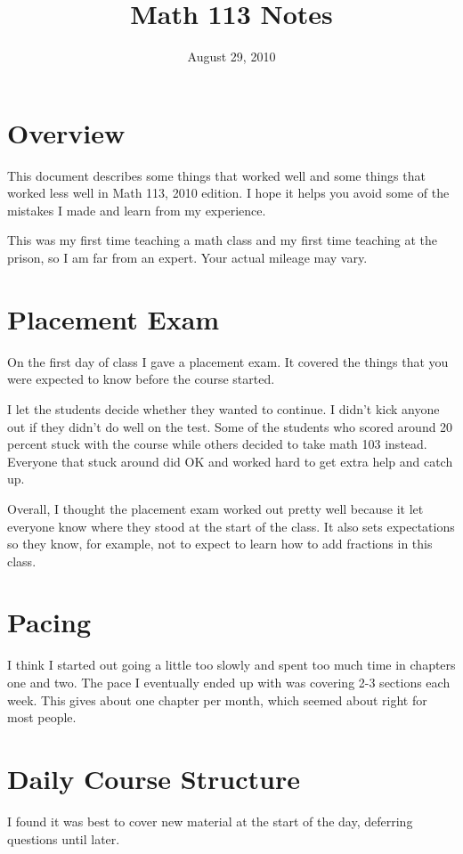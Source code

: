 \documentclass{article}
\title{Math 113 Notes}
\date{August 29, 2010}
\begin{document}
\maketitle

\section{Overview}

This document describes some things that worked well and some things that worked less well in Math 113, 2010 edition.  I
hope it helps you avoid some of the mistakes I made and learn from my experience.

This was my first time teaching a math class and my first time teaching at the prison, so I am far from an expert.  Your
actual mileage may vary.

\section{Placement Exam}
On the first day of class I gave a placement exam.  It covered the things that you were expected to know before the
course started.  

I let the students decide whether they wanted to continue.  I didn't kick anyone out if they didn't do well on the
test.  Some of the students who scored around 20 percent stuck with the course while others decided to take math 103
instead.  Everyone that stuck around did OK and worked hard to get extra help and catch up.  

Overall, I thought the placement exam worked out pretty well because it let everyone know where they stood at the start
of the class.  It also sets expectations so they know, for example, not to expect to learn how to add fractions in this
class.

\section{Pacing}
I think I started out going a little too slowly and spent too much time in chapters one and two.  The pace I eventually
ended up with was covering 2-3 sections each week.  This gives about one chapter per month, which seemed about right for
most people.

\section{Daily Course Structure}
I found it was best to cover new material at the start of the day, deferring questions until later.
\end{document}
